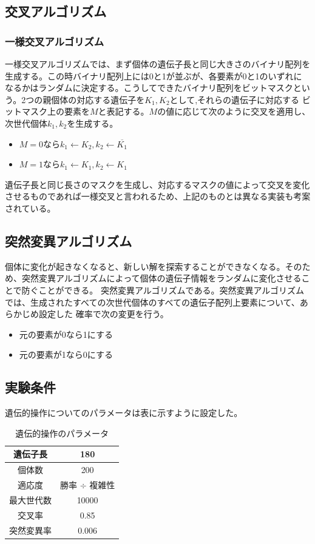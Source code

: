 \subsection{交叉アルゴリズム}
\subsubsection{一様交叉アルゴリズム}
一様交叉アルゴリズムでは、まず個体の遺伝子長と同じ大きさのバイナリ配列を生成する。この時バイナリ配列上には0と1が並ぶが、各要素が0と1のいずれに
なるかはランダムに決定する。こうしてできたバイナリ配列をビットマスクという。2つの親個体の対応する遺伝子を$K_1, K_2$として,それらの遺伝子に対応する
ビットマスク上の要素を$M$と表記する。$M$の値に応じて次のように交叉を適用し、次世代個体$k_1, k_2$を生成する。
  \begin{itemize}
    \item $M = 0$なら$k_1 \leftarrow K_2, k_2 \leftarrow \overline{K_1}$
    \item $M = 1$なら$k_1 \leftarrow K_1, k_2 \leftarrow K_1$
  \end{itemize}
遺伝子長と同じ長さのマスクを生成し、対応するマスクの値によって交叉を変化させるものであれば一様交叉と言われるため、上記のものとは異なる実装も考案されている。

\subsection{突然変異アルゴリズム}
個体に変化が起きなくなると、新しい解を探索することができなくなる。そのため、突然変異アルゴリズムによって個体の遺伝子情報をランダムに変化させることで防ぐことができる。
突然変異アルゴリズムである。突然変異アルゴリズムでは、生成されたすべての次世代個体のすべての遺伝子配列上要素について、あらかじめ設定した
確率で次の変更を行う。
  \begin{itemize}
    \item 元の要素が0なら1にする
    \item 元の要素が1なら0にする
  \end{itemize}

\subsection{実験条件}
遺伝的操作についてのパラメータは表に示すように設定した。

  \begin{table}[htb]
    \centering
    \label{geneticparameter}
    \caption{遺伝的操作のパラメータ}
    \begin{tabular}{|c|c|} \hline
      遺伝子長 & 180 \\ \hline
      個体数 & 200 \\ \hline
      適応度 & 勝率 $\div$ 複雑性 \\ \hline
      最大世代数 & 10000 \\ \hline
      交叉率 & 0.85 \\ \hline
      突然変異率 & 0.006 \\ \hline
    \end{tabular}
  \end{table}

